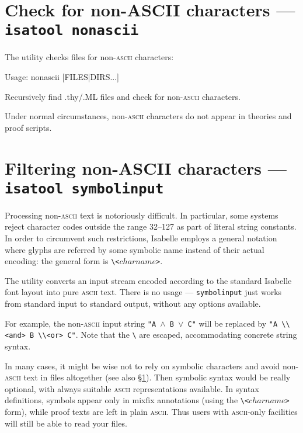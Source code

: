 \section{Check for non-ASCII characters --- \texttt{isatool nonascii}}
\label{sec:tool-nonascii}

The  utility checks files for non-\textsc{ascii} characters:
\begin{ttbox}
Usage: nonascii [FILES|DIRS...]

Recursively find .thy/.ML files and check for non-\textsc{ascii}
characters.
\end{ttbox}
Under normal circumstances, non-\textsc{ascii} characters do not appear in
theories and proof scripts.


\section{Filtering non-ASCII characters --- \texttt{isatool symbolinput}}
\label{sec:tool-symbolinput}

Processing non-\textsc{ascii} text is notoriously difficult.  In particular,
some {\ML} systems reject character codes outside the range 32--127 as part of
literal string constants. In order to circumvent such restrictions, Isabelle
employs a general notation where glyphs are referred by some symbolic name
instead of their actual encoding: the general form is
\verb|\<|$charname$\verb|>|.

The  utility converts an input stream encoded according to
the standard Isabelle font layout into pure \textsc{ascii} text. There is no
usage --- \texttt{symbolinput} just works from standard input to standard
output, without any options available.

\medskip For example, the non-\textsc{ascii} input string \texttt{"A $\land$ B
  $\lor$ C"} will be replaced by \verb|"A \\<and> B \\<or> C"|.  Note that the
\verb|\| are escaped, accommodating concrete {\ML} string syntax.

\medskip In many cases, it might be wise not to rely on symbolic characters
and avoid non-\textsc{ascii} text in files altogether (see also
\S\ref{sec:tool-nonascii}). Then symbolic syntax would be really optional,
with always suitable \textsc{ascii} representations available.  In syntax
definitions, symbols appear only in mixfix annotations (using the
\verb|\<|$charname$\verb|>| form), while proof texts are left in plain
\textsc{ascii}.  Thus users with \textsc{ascii}-only facilities will still be
able to read your files.

